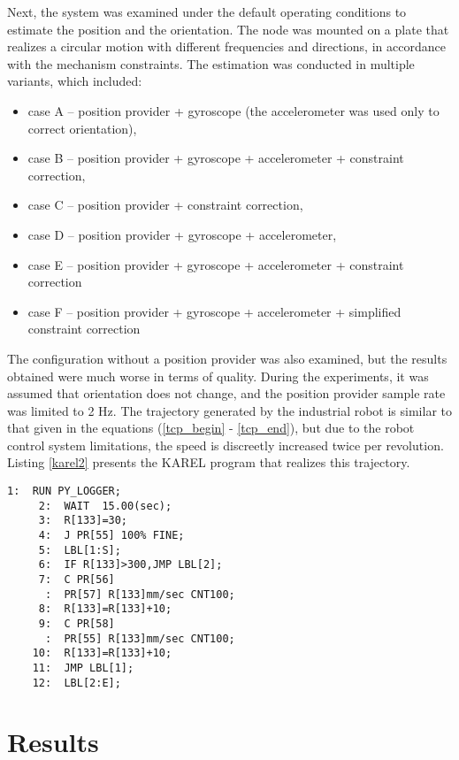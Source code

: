 Next, the system was examined under the default operating conditions to estimate the position and the orientation. The node was mounted on a plate that realizes a circular motion with different frequencies and directions, in accordance with the mechanism constraints. The estimation was conducted in multiple variants, which included:
\begin{itemize}
	\item case A -- position provider + gyroscope (the accelerometer was used only to correct orientation),
	\item case B -- position provider + gyroscope + accelerometer + constraint correction,
	\item case C -- position provider + constraint correction,
	\item case D -- position provider + gyroscope + accelerometer,
	\item case E -- position provider + gyroscope + accelerometer + constraint correction
	\item case F -- position provider + gyroscope + accelerometer + simplified constraint correction
\end{itemize}

The configuration without a position provider was also examined, but the results obtained were much worse in terms of quality. During the experiments, it was assumed that orientation does not change, and the position provider sample rate was limited to 2 Hz. The trajectory generated by the industrial robot is similar to that given in the equations (\ref{tcp_begin} - \ref{tcp_end}), but due to the robot control system limitations, the speed is discreetly increased twice per revolution. Listing \ref{karel2} presents the KAREL program that realizes this trajectory.

\begin{lstlisting}[caption={The KAREL program realizing a circular motion}, captionpos=t, label=karel2]
 	 1:  RUN PY_LOGGER;
	 2:  WAIT  15.00(sec);
	 3:  R[133]=30;
 	 4:  J PR[55] 100% FINE;
	 5:  LBL[1:S];
	 6:  IF R[133]>300,JMP LBL[2];
 	 7:  C PR[56]    
	  :  PR[57] R[133]mm/sec CNT100;
	 8:  R[133]=R[133]+10;
	 9:  C PR[58]    
	  :  PR[55] R[133]mm/sec CNT100;
	10:  R[133]=R[133]+10;
	11:  JMP LBL[1];
	12:  LBL[2:E];
\end{lstlisting}

\section{Results}

